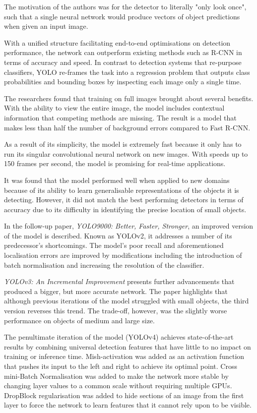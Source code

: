 \documentclass{thesis}
\begin{document}
The motivation of the authors was for the detector to literally "only look once", such that a single neural network would produce vectors of object predictions when given an input image.

With a unified structure facilitating end-to-end optimisations on detection performance, the network can outperform existing methods such as R-CNN in terms of accuracy and speed\cite{yolov1}. In contrast to detection systems that re-purpose classifiers, YOLO re-frames the task into a regression problem that outputs class probabilities and bounding boxes by inspecting each image only a single time. 

The researchers found that training on full images brought about several benefits. With the ability to view the entire image, the model includes contextual information that competing methods are missing\cite{frcnn}. The result is a model that makes less than half the number of background errors compared to Fast R-CNN\cite{yolov1}.

As a result of its simplicity, the model is extremely fast because it only has to run its singular convolutional neural network on new images. With speeds up to 150 frames per second\cite{yolov1}, the model is promising for real-time applications.

It was found that the model performed well when applied to new domains because of its ability to learn generalisable representations of the objects it is detecting. However, it did not match the best performing detectors in terms of accuracy due to its difficulty in identifying the precise location of small objects.

In the follow-up paper, \textit{YOLO9000: Better, Faster, Stronger}, an improved version of the model is described. Known as YOLOv2, it addresses a number of its predecessor's shortcomings. The model's poor recall and aforementioned localisation errors are improved by modifications including the introduction of batch normalisation and increasing the resolution of the classifier\cite{yolo2}.

\textit{YOLOv3: An Incremental Improvement} presents further advancements that produced a bigger, but more accurate network. The paper highlights that although previous iterations of the model struggled with small objects, the third version reverses this trend. The trade-off, however, was the slightly worse performance on objects of medium and large size\cite{yolo3}.

The penultimate iteration of the model (YOLOv4) achieves state-of-the-art results by combining universal detection features that have little to no impact on training or inference time\cite{yolov4}. Mish-activation was added as an activation function that pushes its input to the left and right to achieve its optimal point. Cross mini-Batch Normalisation was added to make the network more stable by changing layer values to a common scale without requiring multiple GPUs. DropBlock regularisation was added to hide sections of an image from the first layer to force the network to learn features that it cannot rely upon to be visible.
\end{document}
